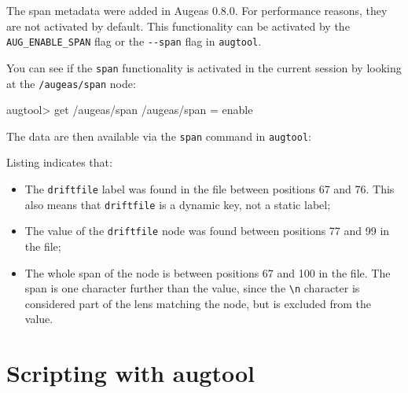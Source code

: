 The span metadata were added in Augeas 0.8.0. For performance reasons, they are not activated by default. This functionality can be activated by the \verb!AUG_ENABLE_SPAN! flag or the \verb!--span! flag in \verb!augtool!.

You can see if the \verb!span! functionality is activated in the current session by looking at the \nolinkurl{/augeas/span} node:


\begin{augtoolsh}[]
augtool> get /augeas/span
/augeas/span = enable
\end{augtoolsh}

The data are then available via the \verb!span! command in \verb!augtool!:



Listing  indicates that:

\begin{itemize}
\item
  The \verb!driftfile! label was found in the file between positions 67 and 76. This also means that \verb!driftfile! is a dynamic key, not a static label;
\item
  The value of the \verb!driftfile! node was found between positions 77 and 99 in the file;
\item
  The whole span of the node is between positions 67 and 100 in the file. The span is one character further than the value, since the \verb!\n! character is considered part of the lens matching the node, but is excluded from the value.
\end{itemize}
\section{Scripting with augtool}


